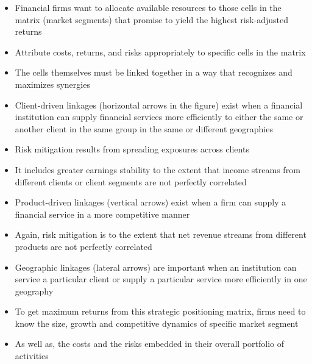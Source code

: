 \documentclass[11pt]{beamer}
\begin{document}
\begin{frame}
\begin{itemize}
\item Financial firms want to allocate available resources to those cells in the matrix (market segments) that promise to yield the highest risk-adjusted returns
\item Attribute costs, returns, and risks appropriately to specific cells in the matrix
\item The cells themselves must be linked together in a way that recognizes and maximizes synergies
\item Client-driven linkages (horizontal arrows in the figure) exist when a financial institution can supply financial services more efficiently to either the same or another client in the same group in the same or different geographies
\end{itemize}
\end{frame}

\begin{frame}
\begin{itemize}
\item Risk mitigation results from spreading exposures across clients
\item It includes greater earnings stability to the extent that income streams from different clients or client segments are not perfectly correlated
\item Product-driven linkages (vertical arrows) exist when a firm can supply a financial service in a more competitive manner
\item Again, risk mitigation is to the extent that net revenue streams from different products are not perfectly correlated
\item Geographic linkages (lateral arrows) are important when an institution can service a particular client or supply a particular service more efficiently in one geography
\item To get maximum returns from this strategic positioning matrix,
firms need to know the size, growth and competitive dynamics of
specific market segment
\item As well as, the costs and the risks embedded in their overall portfolio of activities
\end{itemize}
\end{frame}
\end{document}
